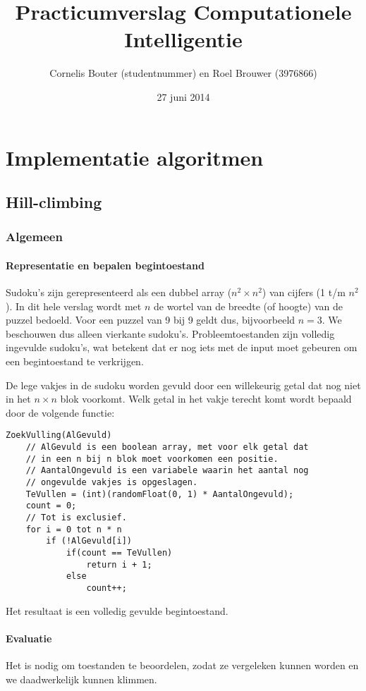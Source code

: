 \documentclass[]{report}
\title{Practicumverslag Computationele Intelligentie}
\author{Cornelis Bouter (studentnummer) en Roel Brouwer (3976866)}
\date{27 juni 2014}
\begin{document}
\maketitle

\chapter{Implementatie algoritmen}
\section{Hill-climbing}
\subsection{Algemeen}
\subsubsection{Representatie en bepalen begintoestand}
Sudoku's zijn gerepresenteerd als een dubbel array ($n^2 \times n^2$)  van cijfers (1 t/m $n^2$). In dit hele verslag wordt met $n$ de wortel van de breedte (of hoogte) van de puzzel bedoeld. Voor een puzzel van 9 bij 9 geldt dus, bijvoorbeeld $n = 3$. We beschouwen dus alleen vierkante sudoku's. Probleemtoestanden zijn volledig ingevulde sudoku's, wat betekent dat er nog iets met de input moet gebeuren om een begintoestand te verkrijgen.

De lege vakjes in de sudoku worden gevuld door een willekeurig getal dat nog niet in het $n \times n$ blok voorkomt. Welk getal in het vakje terecht komt wordt bepaald door de volgende functie:

\begin{minipage}{\textwidth}
\begin{lstlisting}
ZoekVulling(AlGevuld)
	// AlGevuld is een boolean array, met voor elk getal dat
	// in een n bij n blok moet voorkomen een positie.
	// AantalOngevuld is een variabele waarin het aantal nog
	// ongevulde vakjes is opgeslagen.
	TeVullen = (int)(randomFloat(0, 1) * AantalOngevuld);
	count = 0;
	// Tot is exclusief.
	for i = 0 tot n * n
		if (!AlGevuld[i])
			if(count == TeVullen)
				return i + 1;
			else 
				count++;
\end{lstlisting}
\end{minipage}

Het resultaat is een volledig gevulde begintoestand.

\subsubsection{Evaluatie}
Het is nodig om toestanden te beoordelen, zodat ze vergeleken kunnen worden en we daadwerkelijk kunnen klimmen.
\end{document}
